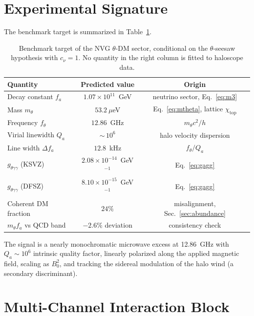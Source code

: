 \documentclass[11pt,a4paper]{article}
\begin{document}
\section{Experimental Signature}
\label{sec:signature}

The benchmark target is summarized in Table~\ref{tab:prediction}.

\begin{table}[h]
\centering
\caption{Benchmark target of the NVG $\theta$-DM sector, conditional on the
$\theta$-seesaw hypothesis with $c_\nu = 1$. No quantity in the right column
is fitted to haloscope data.}
\label{tab:prediction}
\begin{tabular}{lcc}
\toprule
Quantity & Predicted value & Origin \\
\midrule
Decay constant $f_a$ & $1.07\times 10^{11}$~GeV & neutrino sector, Eq.~\eqref{eq:m3} \\
Mass $m_\theta$ & $53.2~\mu$eV & Eq.~\eqref{eq:mtheta}, lattice $\chi_{\mathrm{top}}$ \\
Frequency $f_\theta$ & $12.86$~GHz & $m_\theta c^2/h$ \\
Virial linewidth $Q_a$ & ${\sim}\,10^{6}$ & halo velocity dispersion \\
Line width $\Delta f_a$ & $12.8$~kHz & $f_\theta/Q_a$ \\
$g_{\theta\gamma\gamma}$ (KSVZ) & $2.08\times 10^{-14}$~GeV$^{-1}$ & Eq.~\eqref{eq:gagg} \\
$g_{\theta\gamma\gamma}$ (DFSZ) & $8.10\times 10^{-15}$~GeV$^{-1}$ & Eq.~\eqref{eq:gagg} \\
Coherent DM fraction & $24\%$ & misalignment, Sec.~\ref{sec:abundance} \\
$m_\theta f_a$ vs QCD band & $-2.6\%$ deviation & consistency check \\
\bottomrule
\end{tabular}
\end{table}

The signal is a nearly monochromatic microwave excess at 12.86~GHz with
$Q_a \sim 10^6$ intrinsic quality factor, linearly polarized along the applied
magnetic field, scaling as $B_0^2$, and tracking the sidereal modulation of the
halo wind (a secondary discriminant).

\section{Multi-Channel Interaction Block}
\label{sec:interactions}
\end{document}
